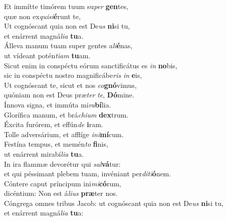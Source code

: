 \evenverse Et immítte timórem tuum su\textit{per} \textbf{gen}tes,~\*\\
\evenverse quæ non ex\textit{qui}\textit{si}\textbf{é}runt te,\\
\oddverse Ut cognóscant quia non est De\textit{us} \textbf{ni}si tu,~\*\\
\oddverse et enárrent magná\textit{li}\textit{a} \textbf{tu}a.\\
\evenverse Álleva manum tuam super gentes a\textit{li}\textbf{é}nas,~\*\\
\evenverse ut vídeant potén\textit{ti}\textit{am} \textbf{tu}am.\\
\oddverse Sicut enim in conspéctu eórum sanctificátus es \textit{in} \textbf{no}bis,~\*\\
\oddverse sic in conspéctu nostro magnificábe\textit{ris} \textit{in} \textbf{e}is,\\
\evenverse Ut cognóscant te, sicut et nos \textit{co}\textbf{gnó}vimus,~\*\\
\evenverse quóniam non est Deus præ\textit{ter} \textit{te}, \textbf{Dó}mine.\\
\oddverse Ínnova signa, et immúta mi\textit{ra}\textbf{bí}lia.~\*\\
\oddverse Glorífica manum, et brá\textit{chi}\textit{um} \textbf{dex}trum.\\
\evenverse Éxcita furórem, et effún\textit{de} \textbf{i}ram.~\*\\
\evenverse Tolle adversárium, et afflíge \textit{i}\textit{ni}\textbf{mí}cum.\\
\oddverse Festína tempus, et memén\textit{to} \textbf{fi}nis,~\*\\
\oddverse ut enárrent mirabí\textit{li}\textit{a} \textbf{tu}a.\\
\evenverse In ira flammæ devorétur qui \textit{sal}\textbf{vá}tur:~\*\\
\evenverse et qui péssimant plebem tuam, invéniant per\textit{di}\textit{ti}\textbf{ó}nem.\\
\oddverse Cóntere caput príncipum ini\textit{mi}\textbf{có}rum,~\*\\
\oddverse dicéntium: Non est á\textit{li}\textit{us} \textbf{præ}ter nos.\\
\evenverse Cóngrega omnes tribus Jacob: ut cognóscant quia non est De\textit{us} \textbf{ni}si tu,~\*\\
\evenverse et enárrent magná\textit{li}\textit{a} \textbf{tu}a:\\

